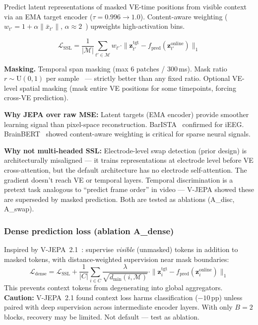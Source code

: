 \documentclass[11pt,letterpaper]{article}
\newcommand{\bfz}{\mathbf{z}}
\newcommand{\pp}{\,\text{pp}}
\begin{document}
Predict latent representations of masked VE-time positions from visible context via an EMA target encoder ($\tau{=}0.996 \to 1.0$). Content-aware weighting ($w_{t'} = 1 + \alpha \|\bar{x}_{t'}\|$, $\alpha{\approx}2$~\cite{wang2023brainbert}) upweights high-activation bins.

\begin{equation}
\mathcal{L}_{\text{SSL}} = \frac{1}{|\mathcal{M}|} \sum_{t' \in \mathcal{M}} w_{t'} \cdot \|\bfz^{\text{tgt}}_{t'} - f_{\text{pred}}(\bfz^{\text{online}}_{t'})\|_1
\end{equation}

\textbf{Masking.} Temporal span masking (max 6 patches / 300\,ms). Mask ratio $r \sim \text{U}(0, 1)$ per sample~\cite{fang2026} --- strictly better than any fixed ratio. Optional VE-level spatial masking (mask entire VE positions for some timepoints, forcing cross-VE prediction).

\textbf{Why JEPA over raw MSE:} Latent targets (EMA encoder) provide smoother learning signal than pixel-space reconstruction. BarISTA~\cite{oganesian2025} confirmed for iEEG. BrainBERT~\cite{wang2023brainbert} showed content-aware weighting is critical for sparse neural signals.

\textbf{Why not multi-headed SSL:} Electrode-level swap detection (prior design) is architecturally misaligned --- it trains representations at electrode level before VE cross-attention, but the default architecture has no electrode self-attention. The gradient doesn't reach VE or temporal layers. Temporal discrimination is a pretext task analogous to ``predict frame order'' in video --- V-JEPA showed these are superseded by masked prediction. Both are tested as ablations (A\_disc, A\_swap).

\subsubsection{Dense prediction loss (ablation A\_dense)}

Inspired by V-JEPA~2.1~\cite{bardes2026vjepa21}: supervise \textit{visible} (unmasked) tokens in addition to masked tokens, with distance-weighted supervision near mask boundaries:
\begin{equation}
\mathcal{L}_{\text{dense}} = \mathcal{L}_{\text{SSL}} + \frac{1}{|C|} \sum_{i \in C} \frac{\lambda}{\sqrt{d_{\min}(i, \mathcal{M})}} \cdot \|\bfz^{\text{tgt}}_i - f_{\text{pred}}(\bfz^{\text{online}}_i)\|_1
\end{equation}
This prevents context tokens from degenerating into global aggregators. \textbf{Caution:} V-JEPA~2.1 found context loss harms classification ($-10\pp$) unless paired with deep supervision across intermediate encoder layers. With only $B{=}2$ blocks, recovery may be limited. Not default --- test as ablation.
\end{document}
